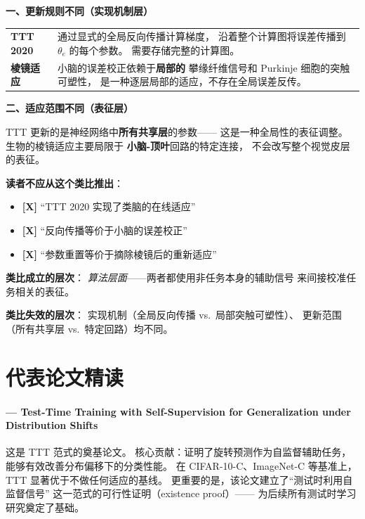 \begin{analogyboundarybox}[title=这个类比在哪里失效]

\textbf{一、更新规则不同（实现机制层）}

\begin{tabular}{p{5cm} p{8cm}}
\textbf{TTT 2020}
& 通过显式的全局反向传播计算梯度，
  沿着整个计算图将误差传播到 $\theta_e$ 的每个参数。
  需要存储完整的计算图。 \\
\textbf{棱镜适应}
& 小脑的误差校正依赖于\textbf{局部的}
  攀缘纤维信号和 Purkinje 细胞的突触可塑性，
  是一种逐层局部的适应，不存在全局误差反传。 \\
\end{tabular}

\medskip\textbf{二、适应范围不同（表征层）}

TTT 更新的是神经网络中\textbf{所有共享层}的参数——
这是一种全局性的表征调整。
生物的棱镜适应主要局限于
\textbf{小脑-顶叶}回路的特定连接，
不会改写整个视觉皮层的表征。

\medskip\textbf{读者不应从这个类比推出}：
\begin{itemize}
  \item \textbf{[X]} ``TTT 2020 实现了类脑的在线适应''
  \item \textbf{[X]} ``反向传播等价于小脑的误差校正''
  \item \textbf{[X]} ``参数重置等价于摘除棱镜后的重新适应''
\end{itemize}

\medskip
\textbf{类比成立的层次}：
\textit{算法层面}——两者都使用非任务本身的辅助信号
来间接校准任务相关的表征。

\textbf{类比失效的层次}：
实现机制（全局反向传播 vs.\ 局部突触可塑性）、
更新范围（所有共享层 vs.\ 特定回路）均不同。

\end{analogyboundarybox}

\section{代表论文精读}
\label{sec:why_test_time_papers}

\paragraph{\citet{sun2020ttt} — Test-Time Training with Self-Supervision for Generalization under Distribution Shifts}
这是 TTT 范式的奠基论文。
核心贡献：证明了旋转预测作为自监督辅助任务，
能够有效改善分布偏移下的分类性能。
在 CIFAR-10-C、ImageNet-C 等基准上，
TTT 显著优于不做任何适应的基线。
更重要的是，该论文建立了``测试时利用自监督信号''
这一范式的可行性证明（existence proof）——
为后续所有测试时学习研究奠定了基础。

